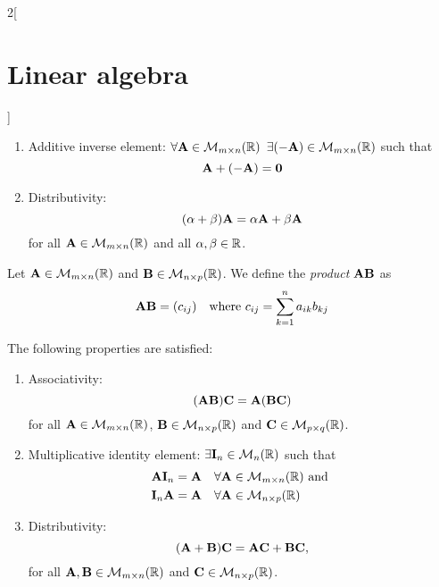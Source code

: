 \documentclass[../../../main.tex]{subfiles}
\begin{document}
\begin{multicols}{2}[\section{Linear algebra}]
\begin{prop}
\begin{enumerate}
      \item Additive inverse element: $\forall\boldsymbol{\mathrm{A}}\in\mathcal{M}_{m\times n}(\mathbb{R})$ $\exists(-\boldsymbol{\mathrm{A}})\in\mathcal{M}_{m\times n}(\mathbb{R})$ such that $$\boldsymbol{\mathrm{A}}+(-\boldsymbol{\mathrm{A}})=\boldsymbol{\mathrm{0}}$$
      \item Distributivity: $$(\alpha+\beta)\boldsymbol{\mathrm{A}}=\alpha\boldsymbol{\mathrm{A}}+\beta\boldsymbol{\mathrm{A}}$$ for all $\boldsymbol{\mathrm{A}}\in\mathcal{M}_{m\times n}(\mathbb{R})$ and all $\alpha,\beta\in\mathbb{R}$.
    \end{enumerate}
  \end{prop}
  \begin{definition}
    Let $\boldsymbol{\mathrm{A}}\in\mathcal{M}_{m\times n}(\mathbb{R})$ and $\boldsymbol{\mathrm{B}}\in\mathcal{M}_{n\times p}(\mathbb{R})$. We define the \emph{product} $\boldsymbol{\mathrm{A}}\boldsymbol{\mathrm{B}}$ as $$\boldsymbol{\mathrm{A}}\boldsymbol{\mathrm{B}}=(c_{ij})\quad\text{where }c_{ij}=\sum_{k=1}^na_{ik}b_{kj}$$
  \end{definition}
  \begin{prop}
    The following properties are satisfied:
    \begin{enumerate}
      \item Associativity: $$(\boldsymbol{\mathrm{A}}\boldsymbol{\mathrm{B}})\boldsymbol{\mathrm{C}}=\boldsymbol{\mathrm{A}}(\boldsymbol{\mathrm{B}}\boldsymbol{\mathrm{C}})$$ for all $\boldsymbol{\mathrm{A}}\in\mathcal{M}_{m\times n}(\mathbb{R})$, $\boldsymbol{\mathrm{B}}\in\mathcal{M}_{n\times p}(\mathbb{R})$ and $\boldsymbol{\mathrm{C}}\in\mathcal{M}_{p\times q}(\mathbb{R})$.
      \item Multiplicative identity element: $\exists\boldsymbol{\mathrm{I}}_n\in\mathcal{M}_n(\mathbb{R})$ such that
            \begin{align*}
               & \boldsymbol{\mathrm{A}}\boldsymbol{\mathrm{I}}_n=\boldsymbol{\mathrm{A}}\quad\forall\boldsymbol{\mathrm{A}}\in\mathcal{M}_{m\times n}(\mathbb{R})\text{ and } \\
               & \boldsymbol{\mathrm{I}}_n\boldsymbol{\mathrm{A}}=\boldsymbol{\mathrm{A}}\quad\forall\boldsymbol{\mathrm{A}}\in\mathcal{M}_{n\times p}(\mathbb{R})
            \end{align*}
      \item Distributivity: $$(\boldsymbol{\mathrm{A}}+\boldsymbol{\mathrm{B}})\boldsymbol{\mathrm{C}}=\boldsymbol{\mathrm{A}}\boldsymbol{\mathrm{C}}+\boldsymbol{\mathrm{B}}\boldsymbol{\mathrm{C}},$$ for all $\boldsymbol{\mathrm{A}},\boldsymbol{\mathrm{B}}\in\mathcal{M}_{m\times n}(\mathbb{R})$ and $\boldsymbol{\mathrm{C}}\in\mathcal{M}_{n\times p}(\mathbb{R})$.
    \end{enumerate}
  \end{prop}

\end{multicols}
\end{document}
